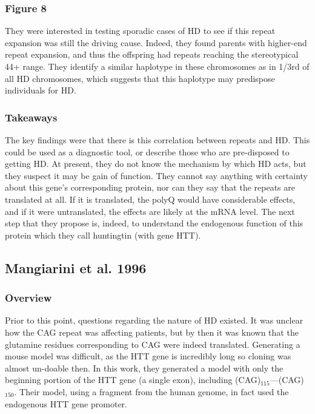 \subsubsection*{Figure 8}

They were interested in testing sporadic cases of HD to see if this repeat expansion was still the driving cause. Indeed, they found parents with higher-end repeat expansion, and thus the offspring had repeats reaching the stereotypical 44+ range. They identify a similar haplotype in these chromosomes as in 1/3rd of all HD chromosomes, which suggests that this haplotype may predispose individuals for HD. 

\subsubsection*{Takeaways}

The key findings were that there is this correlation between repeats and HD. This could be used as a diagnostic tool, or describe those who are pre-disposed to getting HD. At present, they do not know the mechanism by which HD acts, but they suspect it may be gain of function. They cannot say anything with certainty about this gene's corresponding protein, nor can they say that the repeats are translated at all. If it is translated, the polyQ would have considerable effects, and if it were untranslated, the effects are likely at the mRNA level. The next step that they propose is, indeed, to understand the endogenous function of this protein which they call huntingtin (with gene HTT). 


\subsection*{Mangiarini et al. 1996}

\subsubsection*{Overview}

Prior to this point, questions regarding the nature of HD existed. It was unclear how the CAG repeat was affecting patients, but by then it was known that the glutamine residues corresponding to CAG were indeed translated. Generating a mouse model was difficult, as the HTT gene is incredibly long so cloning was almost un-doable then. In this work, they generated a model with only the beginning portion of the HTT gene (a single exon), including (CAG)$_{115}$---(CAG)$_{150}$. Their model, using a fragment from the human genome, in fact used the endogenous HTT gene promoter.\newline

